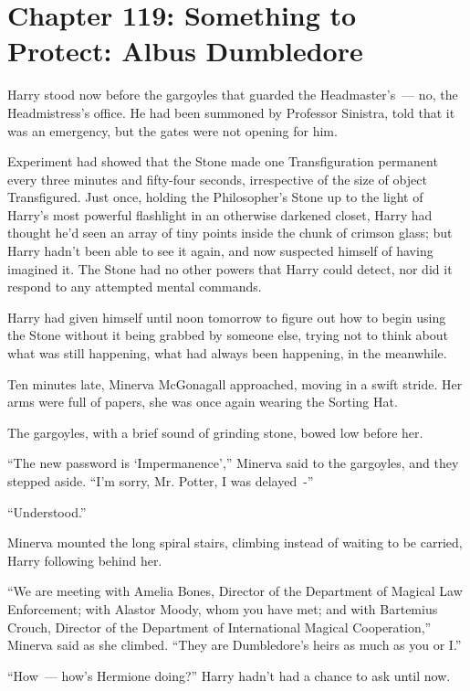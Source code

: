 \chapter{Chapter 119: Something to Protect: Albus Dumbledore}
Harry stood now before the gargoyles that guarded the Headmaster's~--- no, the Headmistress's office. He had been summoned by Professor Sinistra, told that it was an emergency, but the gates were not opening for him.

Experiment had showed that the Stone made one Transfiguration permanent every three minutes and fifty-four seconds, irrespective of the size of object Transfigured. Just once, holding the Philosopher's Stone up to the light of Harry's most powerful flashlight in an otherwise darkened closet, Harry had thought he'd seen an array of tiny points inside the chunk of crimson glass; but Harry hadn't been able to see it again, and now suspected himself of having imagined it. The Stone had no other powers that Harry could detect, nor did it respond to any attempted mental commands.

Harry had given himself until noon tomorrow to figure out how to begin using the Stone without it being grabbed by someone else, trying not to think about what was still happening, what had always been happening, in the meanwhile.

Ten minutes late, Minerva McGonagall approached, moving in a swift stride. Her arms were full of papers, she was once again wearing the Sorting Hat.

The gargoyles, with a brief sound of grinding stone, bowed low before her.

``The new password is `Impermanence','' Minerva said to the gargoyles, and they stepped aside. ``I'm sorry, Mr. Potter, I was delayed~-''

``Understood.''

Minerva mounted the long spiral stairs, climbing instead of waiting to be carried, Harry following behind her.

``We are meeting with Amelia Bones, Director of the Department of Magical Law Enforcement; with Alastor Moody, whom you have met; and with Bartemius Crouch, Director of the Department of International Magical Cooperation,'' Minerva said as she climbed. ``They are Dumbledore's heirs as much as you or I.''

``How~--- how's Hermione doing?'' Harry hadn't had a chance to ask until now.

